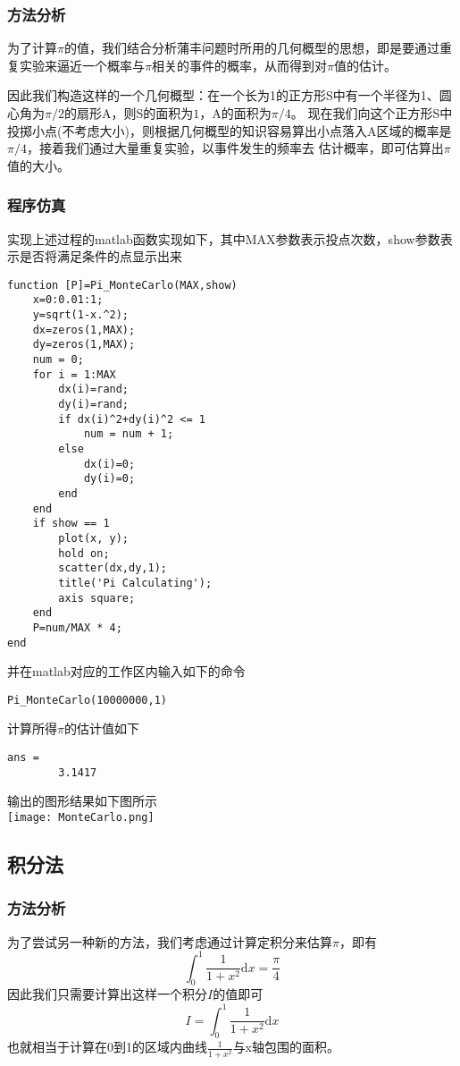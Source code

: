 \documentclass[UTF8]{ctexart}
\begin{document}
    \subsubsection{方法分析}
        为了计算$\pi$的值，我们结合分析蒲丰问题时所用的几何概型的思想，即是要通过重复实验来逼近一个概率与$\pi$相关的事件的概率，从而得到对$\pi$值的估计。\par
        因此我们构造这样的一个几何概型：在一个长为1的正方形S中有一个半径为1、圆心角为$\pi/2$的扇形A，则S的面积为$1$，A的面积为$\pi/4$。
    现在我们向这个正方形S中投掷小点(不考虑大小)，则根据几何概型的知识容易算出小点落入A区域的概率是$\pi/4$，接着我们通过大量重复实验，以事件发生的频率去
    估计概率，即可估算出$\pi$值的大小。
    \subsubsection{程序仿真}
        实现上述过程的matlab函数实现如下，其中MAX参数表示投点次数，show参数表示是否将满足条件的点显示出来
        \begin{lstlisting}[title=Function for Sector in Square, frame=shadowbox]
function [P]=Pi_MonteCarlo(MAX,show)
    x=0:0.01:1;
    y=sqrt(1-x.^2);
    dx=zeros(1,MAX);
    dy=zeros(1,MAX);
    num = 0;
    for i = 1:MAX
        dx(i)=rand;
        dy(i)=rand;
        if dx(i)^2+dy(i)^2 <= 1
            num = num + 1;
        else
            dx(i)=0;
            dy(i)=0;
        end
    end
    if show == 1
        plot(x, y);
        hold on;
        scatter(dx,dy,1);
        title('Pi Calculating');
        axis square;
    end
    P=num/MAX * 4;
end
        \end{lstlisting}
    并在matlab对应的工作区内输入如下的命令
    \begin{lstlisting}[title=Simulation for Sector in Square, frame=shadowbox]
Pi_MonteCarlo(10000000,1)
    \end{lstlisting}
    计算所得$\pi$的估计值如下
    \begin{lstlisting}[title=Result for Sector in Square, frame=shadowbox]
ans =
        3.1417  
    \end{lstlisting}
    输出的图形结果如下图所示\\
    \texttt{[image: MonteCarlo.png]}
    


    \subsection{积分法}
    \subsubsection{方法分析}
        为了尝试另一种新的方法，我们考虑通过计算定积分来估算$\pi$，即有\[ \int_{0}^{1}\frac{1}{1+x^2} \mathrm{d}x = \frac{\pi}{4}\]
    因此我们只需要计算出这样一个积分$I$的值即可\[ I=\int_{0}^{1}\frac{1}{1+x^2} \mathrm{d}x \] 
    也就相当于计算在0到1的区域内曲线$\frac{1}{1+x^2}$与x轴包围的面积。
    
\end{document}
